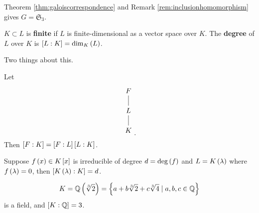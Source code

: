 Theorem \ref{thm:galoiscorrespondence} and Remark \ref{rem:inclusionhomomorphism} gives $ G = \mathfrak{S}_3 $.


\begin{definition}
$ K \subset L $ is \textbf{finite} if $ L $ is finite-dimensional as a vector space over $ K $. The \textbf{degree} of $ L $ over $ K $ is $ \sb{L : K} = \dim_{K}\rb{L} $.
\end{definition}

Two things about this.

\begin{theorem}
\label{thm:towerlaw}
Let
$$
\begin{tikzpicture}
\node (F) at (0, 1) {$ F $};
\node (L) at (0, 0) {$ L $};
\node (K) at (0, -1) {$ K $};
\draw (F) -- (L) -- (K);
\end{tikzpicture}.
$$
Then $ \sb{F : K} = \sb{F : L}\sb{L : K} $.
\end{theorem}

\begin{theorem}
\label{thm:2}
Suppose $ f\rb{x} \in K\sb{x} $ is irreducible of degree $ d = \deg\rb{f} $ and $ L = K\rb{\lambda} $ where $ f\rb{\lambda} = 0 $, then $ \sb{K\rb{\lambda} : K} = d $.
\end{theorem}

\begin{example1}
$$ K = \Q\rb{\sqrt[3]{2}} = \cb{a + b\sqrt[3]{2} + c\sqrt[3]{4} \mid a, b, c \in \Q} $$
is a field, and $ \sb{K : \Q} = 3 $.
\end{example1}

